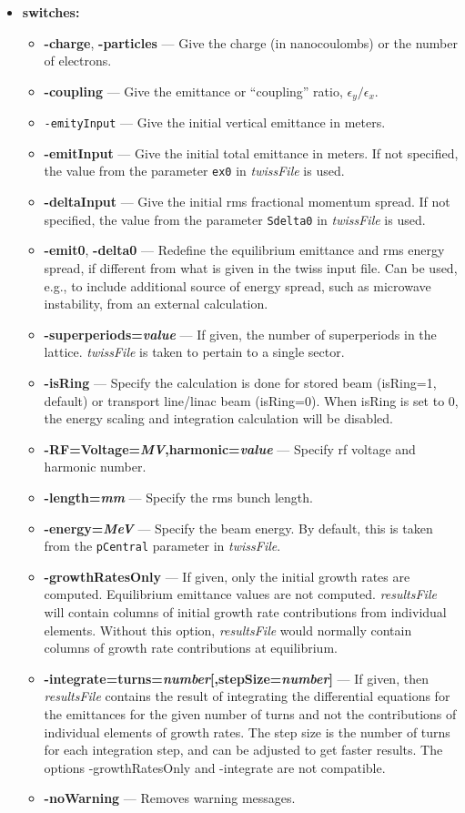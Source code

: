 \documentclass[11pt]{article}
\begin{document}
\begin{itemize}
\item {\bf switches:}
\begin{itemize}
\item {\bf -charge}, {\bf -particles} --- Give the charge (in nanocoulombs) or the
 number of electrons.
\item {\bf -coupling} --- Give the emittance or ``coupling'' ratio, $\epsilon_y/\epsilon_x$.
\item {\tt -emityInput} --- Give the initial vertical emittance in meters.
\item {\bf -emitInput} --- Give the initial total emittance in meters.  If not specified,
the value from the parameter \verb|ex0| in {\em twissFile} is used.
\item {\bf -deltaInput} --- Give the initial rms fractional momentum spread.  If not
specified, the value from the parameter \verb|Sdelta0| in {\em twissFile} is used.
\item {\bf -emit0}, {\bf -delta0}  --- Redefine the equilibrium emittance and rms energy spread, if
  different from what is given in the twiss input file. Can be used, e.g., to include additional source
  of energy spread, such as microwave instability, from an external calculation.
\item {\bf -superperiods={\em value}} --- If given, the number of superperiods in the 
lattice.  {\em twissFile} is taken to pertain to a single sector.
\item {\bf -isRing} --- Specify the calculation is done for stored beam 
(isRing=1, default) or transport line/linac beam (isRing=0). When isRing is set to 0, the energy scaling
and integration calculation will be disabled.  
\item {\bf -RF=Voltage={\em MV},harmonic={\em value}} --- Specify rf voltage and harmonic number.
\item {\bf -length={\em mm}} --- Specify the rms bunch length.
\item {\bf -energy={\em MeV}} --- Specify the beam energy.  By default, this is taken from
 the {\tt pCentral} parameter in {\em twissFile}.
\item {\bf -growthRatesOnly} --- If given, only the initial growth rates are computed.  Equilibrium
emittance values are not computed. {\em resultsFile} will contain columns of initial growth rate
contributions from individual elements. Without this option, {\em resultsFile}
would normally contain columns of growth rate contributions at equilibrium.
\item {\bf -integrate=turns={\em number}[,stepSize={\em number}]} --- 
  If given, then {\em resultsFile}
 contains the result of integrating the differential equations for the emittances for 
 the given number of turns and not the contributions 
 of individual elements of growth rates.  
 The step size is the number of turns for each integration step,
 and can be adjusted to get faster results.
 The options -growthRatesOnly and -integrate are not compatible.
\item {\bf -noWarning} --- Removes warning messages.
\end{itemize}


\end{itemize}
\end{document}
